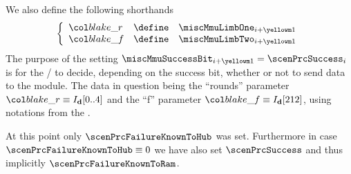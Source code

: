 \begin{description}
\begin{description}
				\saNote{} We also define the following shorthands
				\[
					\left\{ \begin{array}{lcl} \label{hub: instruction handling: call: precompiles: blake: shorthands}
						\locBlakeR & \define & \miscMmuLimbOne _{i + \prcBlakeFirstMiscRowOffset} \\
						\locBlakeF & \define & \miscMmuLimbTwo _{i + \prcBlakeFirstMiscRowOffset} \\
					\end{array} \right.
				\]
				\saNote{}
				The purpose of the setting $\miscMmuSuccessBit _{i + \prcBlakeFirstMiscRowOffset} = \scenPrcSuccess _{i}$ is for the \mmuMod{} / \mmioMod{} to decide, depending on the success bit, whether or not to send data to the \blakeDataMod{} module.
				The data in question being the ``rounds'' parameter $\locBlakeR \equiv I_\textbf{d}[0..4]$ and the ``f'' parameter $\locBlakeF \equiv I_\textbf{d}[212]$, using notations from the \cite{EYP}.

				\saNote{}
				At this point only $\scenPrcFailureKnownToHub$ was set.
				Furthermore in case $\scenPrcFailureKnownToHub \equiv 0$ we have also set $\scenPrcSuccess$ and thus implicitly $\scenPrcFailureKnownToRam$.
		\end{description}
	\end{description}
